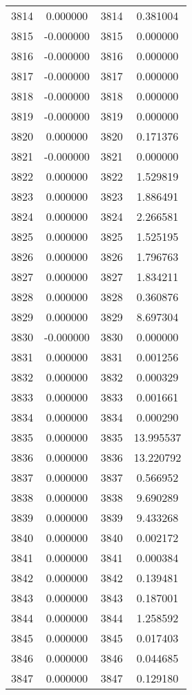 \documentclass[12pt]{article}
\begin{document}
\begin{longtable}{@{}cccc@{}}
3814 & 0.000000 & 3814 & 0.381004 \\
3815 & -0.000000 & 3815 & 0.000000 \\
3816 & -0.000000 & 3816 & 0.000000 \\
3817 & -0.000000 & 3817 & 0.000000 \\
3818 & -0.000000 & 3818 & 0.000000 \\
3819 & -0.000000 & 3819 & 0.000000 \\
3820 & 0.000000 & 3820 & 0.171376 \\
3821 & -0.000000 & 3821 & 0.000000 \\
3822 & 0.000000 & 3822 & 1.529819 \\
3823 & 0.000000 & 3823 & 1.886491 \\
3824 & 0.000000 & 3824 & 2.266581 \\
3825 & 0.000000 & 3825 & 1.525195 \\
3826 & 0.000000 & 3826 & 1.796763 \\
3827 & 0.000000 & 3827 & 1.834211 \\
3828 & 0.000000 & 3828 & 0.360876 \\
3829 & 0.000000 & 3829 & 8.697304 \\
3830 & -0.000000 & 3830 & 0.000000 \\
3831 & 0.000000 & 3831 & 0.001256 \\
3832 & 0.000000 & 3832 & 0.000329 \\
3833 & 0.000000 & 3833 & 0.001661 \\
3834 & 0.000000 & 3834 & 0.000290 \\
3835 & 0.000000 & 3835 & 13.995537 \\
3836 & 0.000000 & 3836 & 13.220792 \\
3837 & 0.000000 & 3837 & 0.566952 \\
3838 & 0.000000 & 3838 & 9.690289 \\
3839 & 0.000000 & 3839 & 9.433268 \\
3840 & 0.000000 & 3840 & 0.002172 \\
3841 & 0.000000 & 3841 & 0.000384 \\
3842 & 0.000000 & 3842 & 0.139481 \\
3843 & 0.000000 & 3843 & 0.187001 \\
3844 & 0.000000 & 3844 & 1.258592 \\
3845 & 0.000000 & 3845 & 0.017403 \\
3846 & 0.000000 & 3846 & 0.044685 \\
3847 & 0.000000 & 3847 & 0.129180 \\

\end{longtable}
\end{document}
